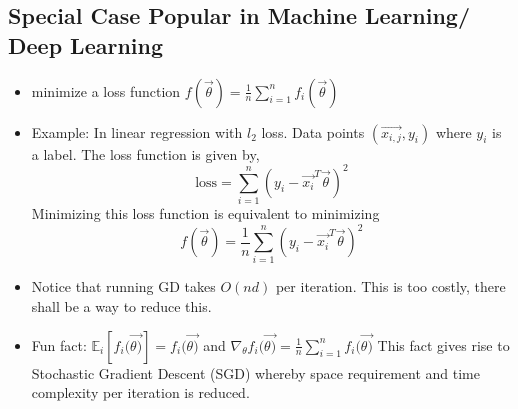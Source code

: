 \documentclass[12pt]{article}
\begin{document}
\subsection{Special Case Popular in Machine Learning/ Deep Learning}
\begin{itemize}
\item minimize a loss function $f(\vec{\theta}) = \frac{1}{n} \sum_{i=1}^{n} f_i(\vec{\theta})$
\item Example: In linear regression with $l_2$ loss. Data points $(\vec{x_{i,j}},y_i)$ where $y_i$ is a label. The loss function is given by, 
$$
\text{loss} =\sum_{i=1}^{n} (y_i - \vec{x_i}^T \vec{\theta})^2
$$
Minimizing this loss function is equivalent to minimizing 
$$
f(\vec{\theta})= \frac{1}{n}\sum_{i=1}^{n} (y_i - \vec{x_i}^T \vec{\theta})^2
$$ 
\item Notice that running GD takes $O(nd)$ per iteration. This is too costly, there shall be a way to reduce this.
\item Fun fact: $\mathbb{E}_i [f_i(\vec{\theta)}] = f_i(\vec{\theta)}$ and $\nabla_{\theta} f_i(\vec{\theta)} = \frac{1}{n}\sum_{i=1}^{n} f_i(\vec{\theta)}$
This fact gives rise to Stochastic Gradient Descent (SGD) whereby space requirement and time complexity per iteration is reduced. 
\end{itemize}
\end{document}
